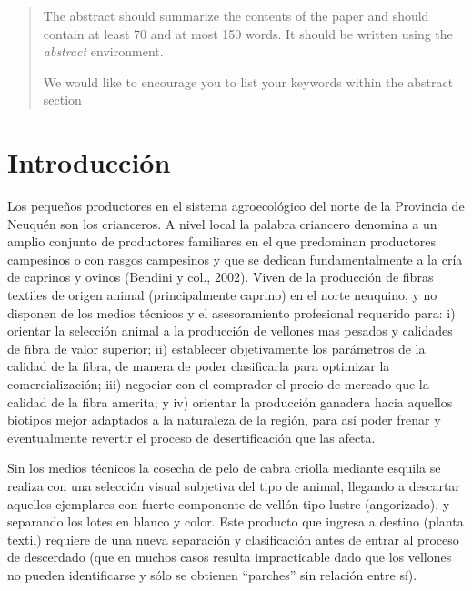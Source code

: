 \documentclass[runningheads,a4paper]{llncs}
\newcommand{\keywords}[1]{\par\addvspace\baselineskip
\noindent\keywordname\enspace\ignorespaces#1}
\begin{document}
\begin{abstract}
The abstract should summarize the contents of the paper and should
contain at least 70 and at most 150 words. It should be written using the
\emph{abstract} environment.
\keywords{We would like to encourage you to list your keywords within
the abstract section}
\end{abstract}


\section{Introducción}

Los pequeños productores en el sistema agroecológico del norte de la Provincia de Neuquén son los crianceros. A nivel local la palabra criancero denomina a un amplio conjunto de productores familiares en el que predominan productores campesinos o con rasgos campesinos y que se dedican fundamentalmente a la cría de caprinos y ovinos (Bendini y col., 2002). Viven de la producción de fibras textiles de origen animal (principalmente caprino) en el norte neuquino, y no disponen de los medios técnicos y el asesoramiento profesional requerido para: i) orientar la selección animal a la producción de vellones mas pesados y calidades de fibra de valor superior; ii) establecer objetivamente los parámetros de la calidad de la fibra, de manera de poder clasificarla para optimizar la comercialización; iii) negociar con el comprador el precio de mercado que la calidad de la fibra amerita; y iv) orientar la producción ganadera hacia aquellos biotipos mejor adaptados a la naturaleza de la región, para así poder frenar y eventualmente revertir el proceso de desertificación que las afecta.

Sin los medios técnicos la cosecha de pelo de cabra criolla mediante esquila se realiza con una selección visual subjetiva del tipo de animal, llegando a descartar aquellos ejemplares con fuerte componente de vellón tipo lustre (angorizado), y separando los lotes en blanco y color. Este producto que ingresa a destino (planta textil) requiere de una nueva separación y clasificación antes de entrar al proceso de descerdado (que en muchos casos resulta impracticable dado que los vellones no pueden identificarse y sólo se obtienen “parches” sin relación entre sí).
\end{document}
